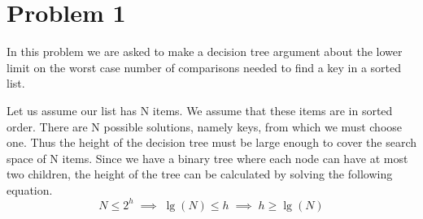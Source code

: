 \section*{Problem 1}

In this problem we are asked to make a decision tree argument about the
lower limit on the worst case number of comparisons needed to find a
key in a sorted list.

Let us assume our list has N items. We assume that these items are in
sorted order. There are N possible solutions, namely keys, from which 
we must choose one. Thus the height of the decision tree must be large
enough to cover the search space of N items. Since we have a binary 
tree where each node can have at most two children, the height of the 
tree can be calculated by solving the following equation.
$$
    N \leq 2^h \; \implies \; 
    \lg (N) \leq h \; \implies \; 
    h \geq \lg (N)
$$
